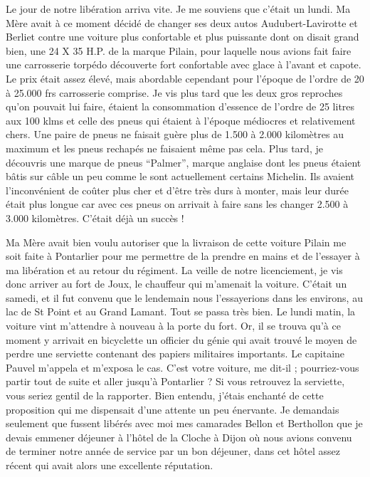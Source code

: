 \documentclass[11pt,a4paper]{report}
\begin{document}
Le jour de notre libération arriva vite. Je me souviens que c'était un lundi. Ma Mère avait à ce moment décidé de changer ses deux autos Audubert-Lavirotte et Berliet contre une voiture plus confortable et plus puissante dont on disait grand bien, une 24 X 35 H.P. de la marque Pilain, pour laquelle nous avions fait faire une carrosserie torpédo découverte fort confortable avec glace à l'avant et capote. Le prix était assez élevé, mais abordable cependant pour l'époque de l'ordre de 20 à 25.000 frs carrosserie comprise. Je vis plus tard que les deux gros reproches qu'on pouvait lui faire, étaient la consommation d'essence de l'ordre de 25 litres aux 100 klms et celle des pneus qui étaient à l'époque médiocres et relativement chers. Une paire de pneus ne faisait guère plus de 1.500 à 2.000 kilomètres au maximum et les pneus rechapés ne faisaient même pas cela. Plus tard, je découvris une marque de pneus ``Palmer'', marque anglaise dont les pneus étaient bâtis sur câble un peu comme le sont actuellement certains Michelin. Ils avaient l'inconvénient de coûter plus cher et d'être très durs à monter, mais leur durée était plus longue car avec ces pneus on arrivait à faire sans les changer 2.500 à 3.000 kilomètres. C'était déjà un succès !

Ma Mère avait bien voulu autoriser que la livraison de cette voiture Pilain me soit faite à Pontarlier pour me permettre de la prendre en mains et de l'essayer à ma libération et au retour du régiment. La veille de notre licenciement, je vis donc arriver au fort de Joux, le chauffeur qui m'amenait la voiture. C'était un samedi, et il fut convenu que le lendemain nous l'essayerions dans les environs, au lac de St Point et au Grand Lamant. Tout se passa très bien. Le lundi matin, la voiture vint m'attendre à nouveau à la porte du fort. Or, il se trouva qu'à ce moment y arrivait en bicyclette un officier du génie qui avait trouvé le moyen de perdre une serviette contenant des papiers militaires importants. Le capitaine Pauvel m'appela et m'exposa le cas. C'est votre voiture, me dit-il ; pourriez-vous partir tout de suite et aller jusqu'à Pontarlier ? Si vous retrouvez la serviette, vous seriez gentil de la rapporter. Bien entendu, j'étais enchanté de cette proposition qui me dispensait d'une attente un peu énervante. Je demandais seulement que fussent libérés avec moi mes camarades Bellon et Berthollon que je devais emmener déjeuner à l'hôtel de la Cloche à Dijon où nous avions convenu de terminer notre année de service par un bon déjeuner, dans cet hôtel assez récent qui avait alors une excellente réputation.
\end{document}
